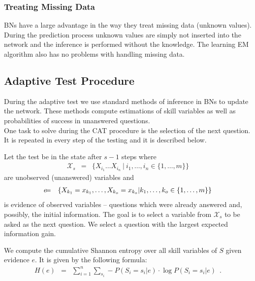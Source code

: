 \subsubsection{Treating Missing Data}
BNs have a large advantage in the way they treat missing data (unknown values). During the prediction process unknown values are simply not inserted into the network and the inference is performed without the knowledge. The learning EM algorithm also has no problems with handling missing data.

\subsection{Adaptive Test Procedure}
During the adaptive test we use standard methods of inference in BNs to update the network. These methods compute estimations of skill variables as well as probabilities of success in unanswered questions.\\
One task to solve during the CAT procedure is the selection of the next question. It is repeated in every step of the testing and it is described below.

Let the test be in the state after $s-1$ steps where 
\begin{eqnarray*}
\mathcal{X}_s & = & \{X_{i_1}\ldots X_{i_n} \ | \ i_1,\ldots,i_n \in \{1,\ldots,m\}\}
\end{eqnarray*}
are unobserved (unanswered) variables and 
\small
\begin{eqnarray*}
\lefteqn{e} &= &\{X_{k_1} = x_{k_1},\ldots,X_{k_o} = x_{k_o} | k_1,\ldots,k_o \in \{1,\ldots,m\}\} 
\end{eqnarray*}
\normalsize
is evidence of observed variables -- questions which were already answered and, possibly, the initial information. 
The goal is to select a variable from $\mathcal{X}_s$ to be asked as the next question. 
We select a question with the largest expected information gain. 

We compute the cumulative Shannon entropy over all skill variables of $S$ given evidence $e$.
It is given by the following formula:
\begin{eqnarray*}
H(e) & = & \sum_{i = 1}^n \sum_{s_i} -P(S_i=s_i|e) \cdot \log P(S_i=s_i|e) \enspace .
\end{eqnarray*}

